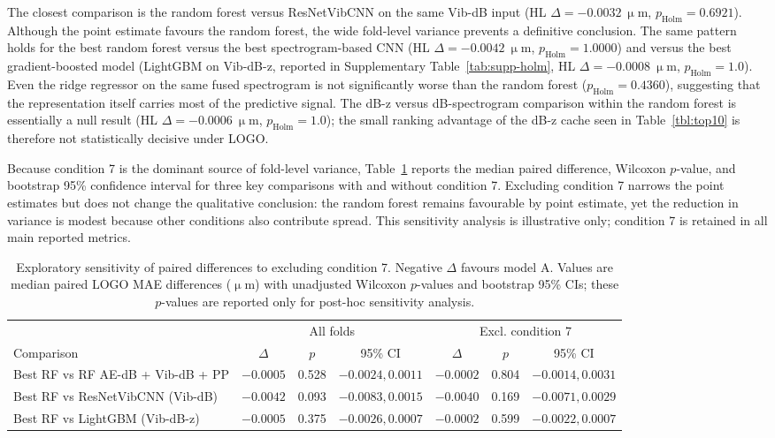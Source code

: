 The closest comparison is the random forest versus ResNetVibCNN on the
same Vib-dB input (HL \(\Delta=-0.0032~\upmu\)m,
\(p_{\text{Holm}}=0.6921\)). Although the point estimate favours the
random forest, the wide fold-level variance prevents a definitive
conclusion. The same pattern holds for the best random forest versus the
best spectrogram-based CNN (HL \(\Delta=-0.0042~\upmu\)m,
\(p_{\text{Holm}}=1.0000\)) and versus the best gradient-boosted model
(LightGBM on Vib-dB-z, reported in Supplementary
Table~\ref{tab:supp-holm}, HL \(\Delta=-0.0008~\upmu\)m,
\(p_{\text{Holm}}=1.0\)). Even the
ridge regressor on the same fused spectrogram is not significantly worse
than the random forest (\(p_{\text{Holm}}=0.4360\)), suggesting that the
representation itself carries most of the predictive signal. The
dB-z versus dB-spectrogram comparison within the random forest is
essentially a null result (HL \(\Delta=-0.0006~\upmu\)m,
\(p_{\text{Holm}}=1.0\)); the small ranking advantage of the dB-z cache
seen in Table~\ref{tbl:top10} is therefore not statistically decisive
under LOGO.

Because condition 7 is the dominant source of fold-level variance,
Table~\ref{tbl:condition7-sensitivity} reports the median paired
difference, Wilcoxon \(p\)-value, and bootstrap 95\% confidence interval
for three key comparisons with and without condition 7. Excluding
condition 7 narrows the point estimates but does not change the
qualitative conclusion: the random forest remains favourable by point
estimate, yet the reduction in variance is modest because other
conditions also contribute spread. This sensitivity analysis is
illustrative only; condition 7 is retained in all main reported metrics.

\begin{table}[htbp]
\centering
\caption{Exploratory sensitivity of paired differences to excluding
condition 7. Negative \(\Delta\) favours model A. Values are median
paired LOGO MAE differences (\(\upmu\)m) with unadjusted Wilcoxon
\(p\)-values and bootstrap 95\% CIs; these \(p\)-values are reported only
for post-hoc sensitivity analysis.}
\label{tbl:condition7-sensitivity}
\begin{tabular}{@{}lcccccc@{}}
\toprule
& \multicolumn{3}{c}{All folds} & \multicolumn{3}{c}{Excl. condition 7} \\
\cmidrule(lr){2-4} \cmidrule(lr){5-7}
Comparison & \(\Delta\) & \(p\) & 95\% CI & \(\Delta\) & \(p\) & 95\% CI \\
\midrule
Best RF vs RF AE-dB + Vib-dB + PP & \(-0.0005\) & 0.528 & \(-0.0024, 0.0011\) & \(-0.0002\) & 0.804 & \(-0.0014, 0.0031\) \\
Best RF vs ResNetVibCNN (Vib-dB) & \(-0.0042\) & 0.093 & \(-0.0083, 0.0015\) & \(-0.0040\) & 0.169 & \(-0.0071, 0.0029\) \\
Best RF vs LightGBM (Vib-dB-z) & \(-0.0005\) & 0.375 & \(-0.0026, 0.0007\) & \(-0.0002\) & 0.599 & \(-0.0022, 0.0007\) \\
\bottomrule
\end{tabular}
\end{table}


